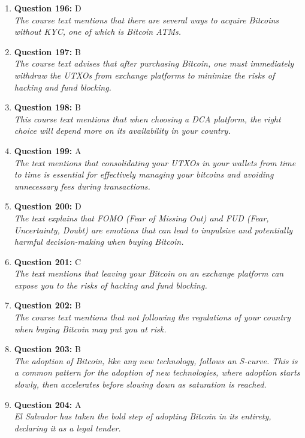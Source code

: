 \documentclass[12pt,a4paper]{article}
\begin{document}
\begin{enumerate}
\item \textbf{Question 196:} D
\\ \textit{The course text mentions that there are several ways to acquire Bitcoins without KYC, one of which is Bitcoin ATMs.}

\item \textbf{Question 197:} B
\\ \textit{The course text advises that after purchasing Bitcoin, one must immediately withdraw the UTXOs from exchange platforms to minimize the risks of hacking and fund blocking.}

\item \textbf{Question 198:} B
\\ \textit{This course text mentions that when choosing a DCA platform, the right choice will depend more on its availability in your country.}

\item \textbf{Question 199:} A
\\ \textit{The text mentions that consolidating your UTXOs in your wallets from time to time is essential for effectively managing your bitcoins and avoiding unnecessary fees during transactions.}

\item \textbf{Question 200:} D
\\ \textit{The text explains that FOMO (Fear of Missing Out) and FUD (Fear, Uncertainty, Doubt) are emotions that can lead to impulsive and potentially harmful decision-making when buying Bitcoin.}

\item \textbf{Question 201:} C
\\ \textit{The text mentions that leaving your Bitcoin on an exchange platform can expose you to the risks of hacking and fund blocking.}

\item \textbf{Question 202:} B
\\ \textit{The course text mentions that not following the regulations of your country when buying Bitcoin may put you at risk.}

\item \textbf{Question 203:} B
\\ \textit{The adoption of Bitcoin, like any new technology, follows an S-curve. This is a common pattern for the adoption of new technologies, where adoption starts slowly, then accelerates before slowing down as saturation is reached.}

\item \textbf{Question 204:} A
\\ \textit{El Salvador has taken the bold step of adopting Bitcoin in its entirety, declaring it as a legal tender.}


\end{enumerate}
\end{document}
